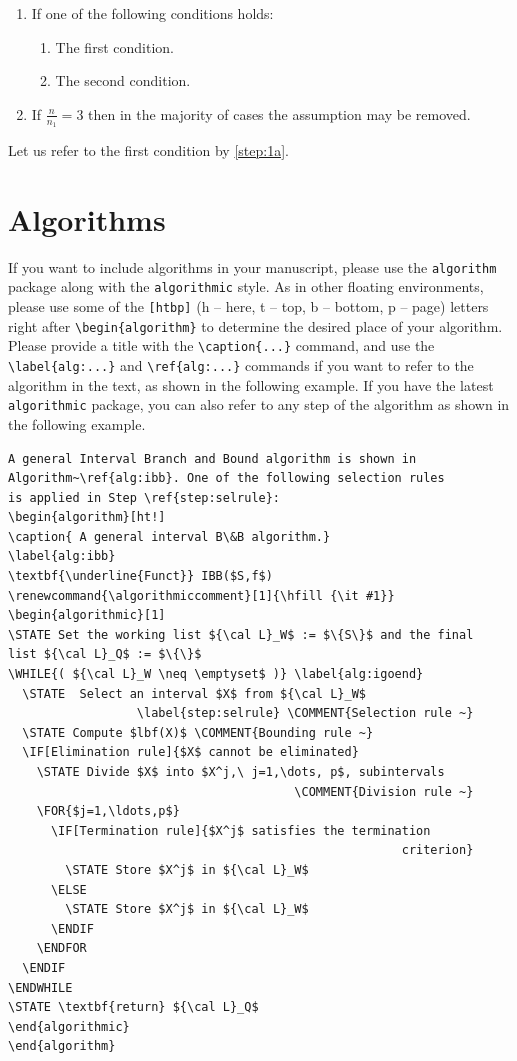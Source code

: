 \documentclass[notnumberedtheorems,withtitlethanks]{actacyb}
\begin{document}
\begin{enumerate}
\item If one of the following conditions holds:
\begin{enumerate}
\item The first condition.\label{step:1a}
\item The second condition.
\end{enumerate}
\item If ${\frac{n}{n_1}}=3$ then in the majority of cases the 
assumption may be removed.
\end{enumerate}

Let us refer to the first condition by \ref{step:1a}.


\section{Algorithms}

If you want to include algorithms in your manuscript, please use the \verb|algorithm| package along with the \verb|algorithmic| style.
As in other floating environments, please use some of the \verb|[htbp]| (h -- here, t -- top, b -- bottom, p -- page) letters right after \verb|\begin{algorithm}| to determine the desired place of your algorithm. Please provide a title with the \verb|\caption{...}| command, and use the \verb|\label{alg:...}| and \verb|\ref{alg:...}| commands if you want to refer to the algorithm in the text, as shown in the following example.
If you have the latest \verb|algorithmic| package, you can also refer to any step of the algorithm as shown in the following example.

\begin{verbatim}
A general Interval Branch and Bound algorithm is shown in 
Algorithm~\ref{alg:ibb}. One of the following selection rules
is applied in Step \ref{step:selrule}:
\begin{algorithm}[ht!]
\caption{ A general interval B\&B algorithm.} 
\label{alg:ibb} 
\textbf{\underline{Funct}} IBB($S,f$)
\renewcommand{\algorithmiccomment}[1]{\hfill {\it #1}}
\begin{algorithmic}[1]
\STATE Set the working list ${\cal L}_W$ := $\{S\}$ and the final 
list ${\cal L}_Q$ := $\{\}$     
\WHILE{( ${\cal L}_W \neq \emptyset$ )} \label{alg:igoend}
  \STATE  Select an interval $X$ from ${\cal L}_W$
                  \label{step:selrule} \COMMENT{Selection rule ~}  
  \STATE Compute $lbf(X)$ \COMMENT{Bounding rule ~}		  
  \IF[Elimination rule]{$X$ cannot be eliminated}
    \STATE Divide $X$ into $X^j,\ j=1,\dots, p$, subintervals   
                                        \COMMENT{Division rule ~}
    \FOR{$j=1,\ldots,p$}
      \IF[Termination rule]{$X^j$ satisfies the termination 
                                                       criterion}
        \STATE Store $X^j$ in ${\cal L}_W$ 
      \ELSE
        \STATE Store $X^j$ in ${\cal L}_W$ 
      \ENDIF
    \ENDFOR  
  \ENDIF
\ENDWHILE
\STATE \textbf{return} ${\cal L}_Q$
\end{algorithmic}
\end{algorithm}
\end{verbatim}
\end{document}
